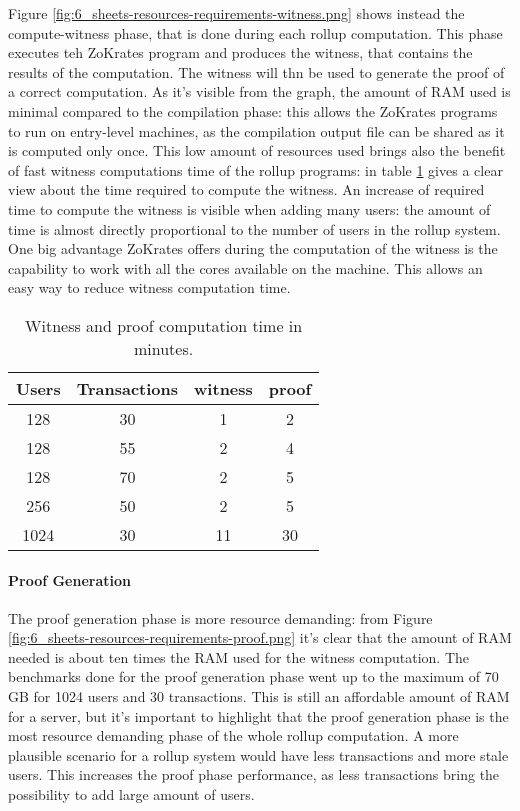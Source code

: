 Figure \ref{fig:6_sheets-resources-requirements-witness.png} shows instead the compute-witness phase, that is done during each rollup computation. This phase executes teh ZoKrates program and produces the witness, that contains the results of the computation. The witness will thn be used to generate the proof of a correct computation. As it's visible from the graph, the amount of RAM used is minimal compared to the compilation phase: this allows the ZoKrates programs to run on entry-level machines, as the compilation output file can be shared as it is computed only once. This low amount of resources used brings also the benefit of fast witness computations time of the rollup programs: in table \ref{tab:6_witness-proof-time} gives a clear view about the time required to compute the witness. An increase of required time to compute the witness is visible when adding many users: the amount of time is almost directly proportional to the number of users in the rollup system. One big advantage ZoKrates offers during the computation of the witness is the capability to work with all the cores available on the machine. This allows an easy way to reduce witness computation time.

\begin{table}
	\centering
	\begin{tabular}{|c|c|c|c|}
		\hline
		Users & Transactions & witness & proof \\ \hline
		128   & 30           & 1       & 2     \\ \hline
		128   & 55           & 2       & 4     \\ \hline
		128   & 70           & 2       & 5     \\ \hline
		256   & 50           & 2       & 5     \\ \hline
		1024  & 30           & 11      & 30    \\ \hline
	\end{tabular}
	\caption[Witness Proof time]{Witness and proof computation time in minutes.}
	\label{tab:6_witness-proof-time}
\end{table}

\paragraph{Proof Generation}

The proof generation phase is more resource demanding: from Figure \ref{fig:6_sheets-resources-requirements-proof.png} it's clear that the amount of RAM needed is about ten times the RAM used for the witness computation. The benchmarks done for the proof generation phase went up to the maximum of 70 GB for 1024 users and 30 transactions. This is still an affordable amount of RAM for a server, but it's important to highlight that the proof generation phase is the most resource demanding phase of the whole rollup computation. A more plausible scenario for a rollup system would have less transactions and more stale users. This increases the proof phase performance, as less transactions bring the possibility to add large amount of users.

